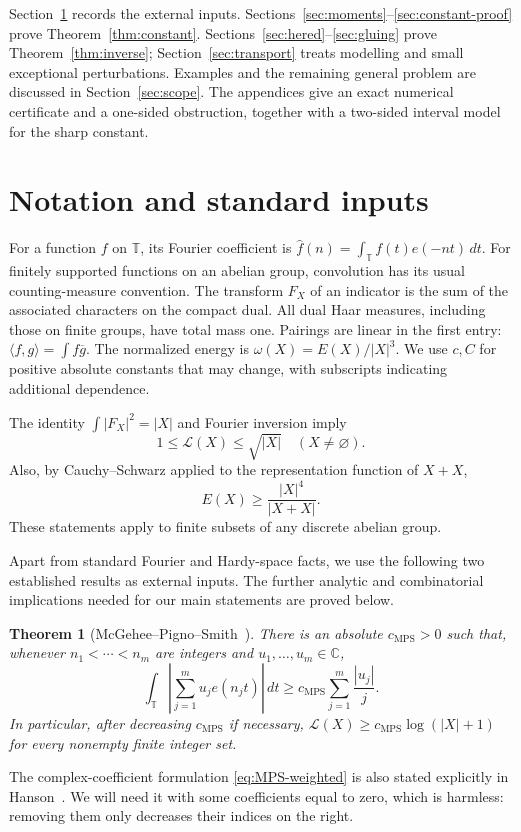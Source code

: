\documentclass[11pt,reqno]{amsart}
\numberwithin{equation}{section}
\newtheorem{theorem}{Theorem}[section]
\theoremstyle{definition}
\theoremstyle{remark}
\newcommand{\T}{\mathbb T}
\newcommand{\C}{\mathbb C}
\newcommand{\La}{\mathcal L}
\newcommand{\ip}[2]{\langle#1,#2\rangle}
\newcommand{\cMPS}{c_{\mathrm{MPS}}}
\begin{document}
Section~\ref{sec:preliminaries} records the external inputs.
Sections~\ref{sec:moments}--\ref{sec:constant-proof} prove
Theorem~\ref{thm:constant}. Sections~\ref{sec:hered}--\ref{sec:gluing}
prove Theorem~\ref{thm:inverse}; Section~\ref{sec:transport} treats modelling
and small exceptional perturbations. Examples and the remaining general
problem are discussed in Section~\ref{sec:scope}. The appendices give
an exact numerical certificate and a one-sided obstruction, together
with a two-sided interval model for the sharp constant.

\section{Notation and standard inputs}\label{sec:preliminaries}

For a function $f$ on $\T$, its Fourier coefficient is
$\widehat f(n)=\int_\T f(t)e(-nt)\,dt$. For finitely supported functions on
an abelian group, convolution has its usual counting-measure convention.
The transform $F_X$ of an indicator is the sum of the associated
characters on the compact dual. All dual Haar measures, including those
on finite groups, have total mass one. Pairings are linear in the first
entry: $\ip fg=\int f\overline g$. The normalized energy is
$\omega(X)=E(X)/|X|^3$. We use $c,C$ for positive absolute constants that
may change, with subscripts indicating additional dependence.

The identity $\int|F_X|^2=|X|$ and Fourier inversion imply
\begin{equation}\label{eq:trivial-norms}
 1\le\La(X)\le\sqrt{|X|}\quad(X\ne\varnothing).
\end{equation}
Also, by Cauchy--Schwarz applied to the representation function of $X+X$,
\begin{equation}\label{eq:energy-doubling}
 E(X)\ge\frac{|X|^4}{|X+X|}.
\end{equation}
These statements apply to finite subsets of any discrete abelian group.

Apart from standard Fourier and Hardy-space facts, we use the following
two established results as external inputs. The further analytic and
combinatorial implications needed for our main statements are proved below.

\begin{theorem}[McGehee--Pigno--Smith~\cite{MPS}]\label{thm:MPS}
There is an absolute $\cMPS>0$ such that, whenever
$n_1<\cdots<n_m$ are integers and $u_1,\ldots,u_m\in\C$,
\begin{equation}\label{eq:MPS-weighted}
 \int_\T\left|\sum_{j=1}^m u_je(n_jt)\right|\,dt
 \ge\cMPS\sum_{j=1}^m\frac{|u_j|}{j}.
\end{equation}
In particular, after decreasing $\cMPS$ if necessary,
$\La(X)\ge\cMPS\log(|X|+1)$ for every nonempty finite integer set.
\end{theorem}
The complex-coefficient formulation \eqref{eq:MPS-weighted} is also
stated explicitly in Hanson~\cite[Theorem 1.1]{Hanson}. We will need it
with some coefficients equal to zero, which is harmless: removing them
only decreases their indices on the right.
\end{document}
